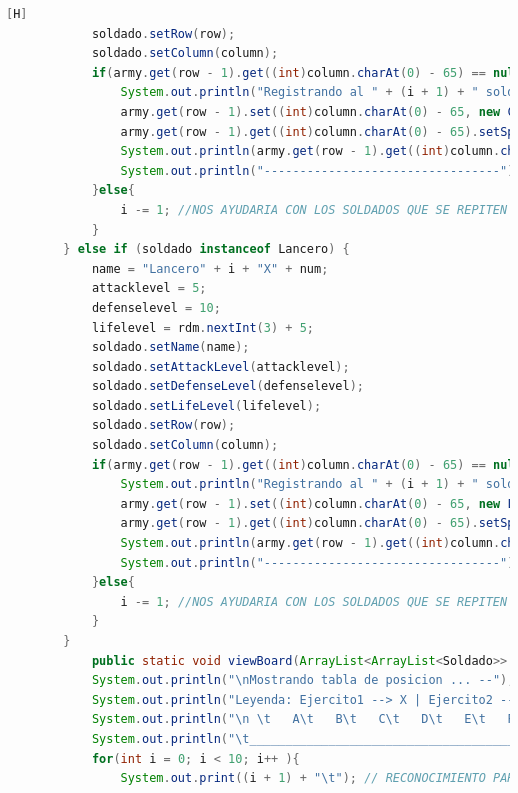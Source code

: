 \documentclass{article}
\begin{document}
\begin{lstlisting}[language=java,caption={Las lineas de codigos de la clase Mapa creada:}][H]
			soldado.setRow(row);
			soldado.setColumn(column);
			if(army.get(row - 1).get((int)column.charAt(0) - 65) == null){
				System.out.println("Registrando al " + (i + 1) + " soldado del Ejercito " + armyespe + "");
				army.get(row - 1).set((int)column.charAt(0) - 65, new Caballero(name, attacklevel, defenselevel, lifelevel, speed, "Caballero", true, row, column, false));
				army.get(row - 1).get((int)column.charAt(0) - 65).setSpeed(speed);
				System.out.println(army.get(row - 1).get((int)column.charAt(0) - 65).toString());
				System.out.println("---------------------------------");
			}else{
				i -= 1; //NOS AYUDARIA CON LOS SOLDADOS QUE SE REPITEN EN EL MISMO CASILLERO CON TAL QUE NO DEBERIA CONTAR 
			}
		} else if (soldado instanceof Lancero) {
			name = "Lancero" + i + "X" + num; 
			attacklevel = 5;
			defenselevel = 10;
			lifelevel = rdm.nextInt(3) + 5;
			soldado.setName(name);                  
			soldado.setAttackLevel(attacklevel);
			soldado.setDefenseLevel(defenselevel);                    
			soldado.setLifeLevel(lifelevel);
			soldado.setRow(row);
			soldado.setColumn(column);
			if(army.get(row - 1).get((int)column.charAt(0) - 65) == null){
				System.out.println("Registrando al " + (i + 1) + " soldado del Ejercito " + armyespe + "");
				army.get(row - 1).set((int)column.charAt(0) - 65, new Lancero(name, attacklevel, defenselevel, lifelevel, speed, "Lancero", true, row, column, attacklevel));
				army.get(row - 1).get((int)column.charAt(0) - 65).setSpeed(speed);
				System.out.println(army.get(row - 1).get((int)column.charAt(0) - 65).toString());
				System.out.println("---------------------------------");
			}else{
				i -= 1; //NOS AYUDARIA CON LOS SOLDADOS QUE SE REPITEN EN EL MISMO CASILLERO CON TAL QUE NO DEBERIA CONTAR 
			}
		}			
			public static void viewBoard(ArrayList<ArrayList<Soldado>> army1, ArrayList<ArrayList<Soldado>> army2){ //EN ESTE METODO DEMOSTRAREMOS LA TABLA REUTILIZAREMOS CODIGOS DE ANTERIORES LABORATORIOS PARA PODER HACER LA BASE DE ESTE TABLERO
			System.out.println("\nMostrando tabla de posicion ... --");
			System.out.println("Leyenda: Ejercito1 --> X | Ejercito2 --> Y"); //RECONOCIMIENTO PARA LOS EJERCITOS Y POSICION DE SUS SOLDADOS
			System.out.println("\n \t   A\t   B\t   C\t   D\t   E\t   F\t   G\t   H\t   I\t   J"); // RECONOCIMIENTO PARA CADA UBICACION DE CADA SOLDADO EN EL TABLERO POR PARTE DE LAS COLUMNAS
			System.out.println("\t_________________________________________________________________________________");
			for(int i = 0; i < 10; i++ ){
				System.out.print((i + 1) + "\t"); // RECONOCIMIENTO PARA CADA UBICACION DE CADA SOLDADO EN EL TABLERO POR PARTE DE LAS FILAS

\end{lstlisting}
\end{document}

